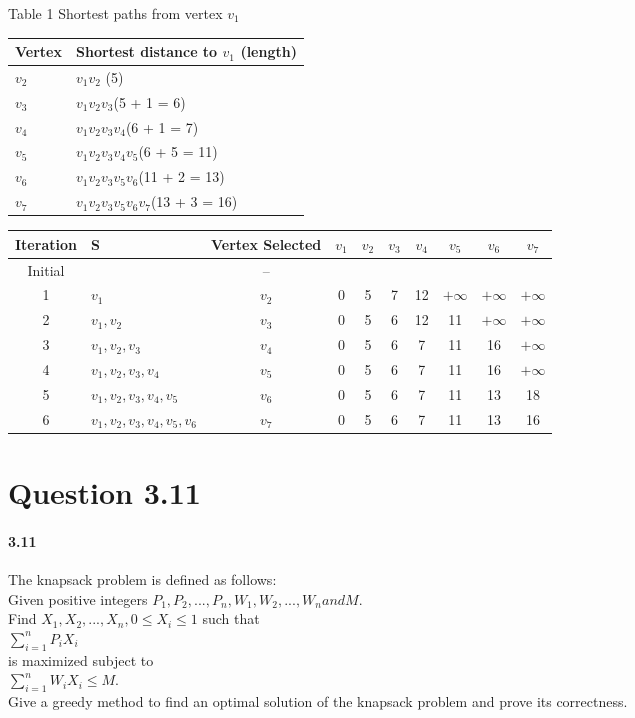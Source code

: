 \documentclass{article}
\begin{document}
	\begin{center}{Table 1 Shortest paths from vertex $v_1$}
	\begin{tabu} to 	
	\hline
	Vertex & Shortest distance to $v_1$ (length)\\
	\hline
	$v_2$ & $v_1v_2$ (5)\\
	$v_3$ & $v_1v_2v_3$(5 + 1 = 6)\\
	$v_4$ & $v_1v_2v_3v_4$(6 + 1 = 7)\\
	$v_5$ & $v_1v_2v_3v_4v_5$(6 + 5 = 11)\\
	$v_6$ & $v_1v_2v_3v_5v_6$(11 + 2 = 13)\\
	$v_7$ & $v_1v_2v_3v_5v_6v_7$(13 + 3 = 16)\\
	\hline
\end{tabu}
\end{center}

\begin{table} [!hbp]
	\begin{tabular}{clcccccccc}
	Iteration& S & Vertex Selected & $v_1$ & $v_2$ & $v_3$ &$v_4$ &$v_5$ &$v_6$ &$v_7$\\
	\hline
	Initial & & -- \\
	1 & $v_1$ & $v_2$ & 0 & 5 &7 & 12 & $+\infty$ & $+\infty$ &$+\infty$ \\
	2 & $v_1, v_2$ & $v_3$ & 0 & 5 & 6 & 12 & 11 & $+\infty$ & $+\infty$\\
	3 & $v_1, v_2, v_3$ & $v_4$ & 0 & 5 & 6 & 7 & 11 & 16  & $+\infty$\\
	4 & $v_1, v_2, v_3, v_4$ & $v_5$ & 0 & 5 & 6 & 7 & 11 & 16 & $+\infty$\\
	
	5 & $v_1, v_2, v_3, v_4, v_5 $ & $v_6$ & 0 & 5 & 6 & 7 & 11 & 13 & 18\\
	6 & $v_1, v_2, v_3, v_4, v_5, v_6$ &$v_7$&  0 & 5 & 6 & 7 & 11 & 13 & 16\\

\end{tabular}
	\end{table}
\section{Question 3.11}
\paragraph{3.11}
	The knapsack problem is defined as follows:\\
	Given positive integers $P_1, P_2, ... , P_n, W_1, W_2, ..., W_n and M$.\\
	Find $X_1, X_2, ..., X_n, 0 \leq X_i \leq 1 $ such that\\
	$\sum_{i=1}^{n} P_iX_i $\\
	is maximized subject to\\
	$\sum_{i=1}^{n}W_iX_i \leq M$.\\
	Give a greedy method to find an optimal solution of the knapsack problem and prove its correctness.
\end{document}
